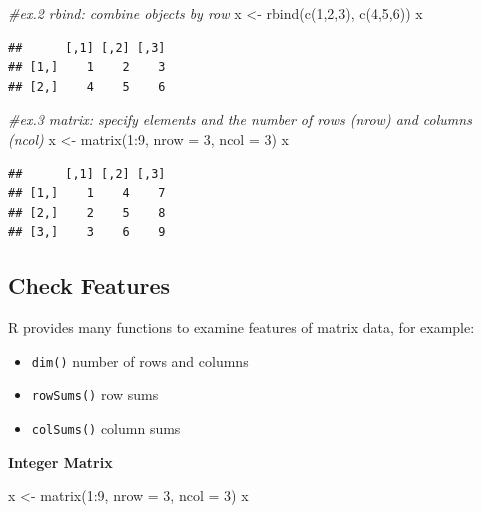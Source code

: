 \documentclass[
]{book}
\newenvironment{Shaded}{\begin{snugshade}}{\end{snugshade}}
\newcommand{\AttributeTok}[1]{\textcolor[rgb]{0.77,0.63,0.00}{#1}}
\newcommand{\CommentTok}[1]{\textcolor[rgb]{0.56,0.35,0.01}{\textit{#1}}}
\newcommand{\DecValTok}[1]{\textcolor[rgb]{0.00,0.00,0.81}{#1}}
\newcommand{\FunctionTok}[1]{\textcolor[rgb]{0.00,0.00,0.00}{#1}}
\newcommand{\NormalTok}[1]{#1}
\newcommand{\OtherTok}[1]{\textcolor[rgb]{0.56,0.35,0.01}{#1}}
\newcommand{\SpecialCharTok}[1]{\textcolor[rgb]{0.00,0.00,0.00}{#1}}
\providecommand{\tightlist}{%
  \setlength{\itemsep}{0pt}\setlength{\parskip}{0pt}}
\begin{document}
\begin{Shaded}
\begin{Highlighting}[]
\CommentTok{\#ex.2 rbind: combine objects by row}
\NormalTok{x }\OtherTok{\textless{}{-}} \FunctionTok{rbind}\NormalTok{(}\FunctionTok{c}\NormalTok{(}\DecValTok{1}\NormalTok{,}\DecValTok{2}\NormalTok{,}\DecValTok{3}\NormalTok{), }\FunctionTok{c}\NormalTok{(}\DecValTok{4}\NormalTok{,}\DecValTok{5}\NormalTok{,}\DecValTok{6}\NormalTok{))}
\NormalTok{x}
\end{Highlighting}
\end{Shaded}

\begin{verbatim}
##      [,1] [,2] [,3]
## [1,]    1    2    3
## [2,]    4    5    6
\end{verbatim}

\begin{Shaded}
\begin{Highlighting}[]
\CommentTok{\#ex.3 matrix: specify elements and the number of rows (nrow) and columns (ncol)}
\NormalTok{x }\OtherTok{\textless{}{-}} \FunctionTok{matrix}\NormalTok{(}\DecValTok{1}\SpecialCharTok{:}\DecValTok{9}\NormalTok{, }\AttributeTok{nrow =} \DecValTok{3}\NormalTok{, }\AttributeTok{ncol =} \DecValTok{3}\NormalTok{)}
\NormalTok{x}
\end{Highlighting}
\end{Shaded}

\begin{verbatim}
##      [,1] [,2] [,3]
## [1,]    1    4    7
## [2,]    2    5    8
## [3,]    3    6    9
\end{verbatim}

\hypertarget{check-features-1}{%
\subsection{Check Features}\label{check-features-1}}

R provides many functions to examine features of matrix data, for example:

\begin{itemize}
\tightlist
\item
  \texttt{dim()} number of rows and columns
\item
  \texttt{rowSums()} row sums
\item
  \texttt{colSums()} column sums
\end{itemize}

\textbf{Integer Matrix}

\begin{Shaded}
\begin{Highlighting}[]
\NormalTok{x }\OtherTok{\textless{}{-}} \FunctionTok{matrix}\NormalTok{(}\DecValTok{1}\SpecialCharTok{:}\DecValTok{9}\NormalTok{, }\AttributeTok{nrow =} \DecValTok{3}\NormalTok{, }\AttributeTok{ncol =} \DecValTok{3}\NormalTok{)}
\NormalTok{x}
\end{Highlighting}
\end{Shaded}
\end{document}
